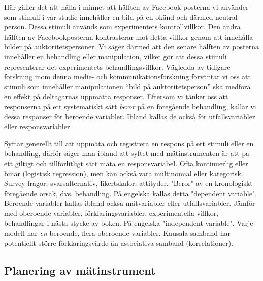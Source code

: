 \documentclass[
]{book}
\begin{document}
Här gäller det att hålla i minnet att hälften av Facebook-posterna vi använder som stimuli i vår studie innehåller en bild på en okänd och därmed neutral person. Dessa stimuli används som experimentets kontrollvillkor. Den andra hälften av Facebookposterna kontrasterar mot detta villkor genom att innehålla bilder på auktoritetspersoner. Vi säger därmed att den senare hälften av posterna innehåller en behandling eller manipulation, vilket gör att dessa stimuli representerar det experimentets behandlingsvillkor. Vägledda av tidigare forskning inom denna medie- och kommunikationsforskning förväntar vi oss att stimuli som innehåller manipulationen ``bild på auktoritetsperson'' ska medföra en effekt på deltagarnas uppmätta responser. Eftersom vi tänker oss att responserna på ett systematiskt sätt \emph{beror} på en föregående behandling, kallar vi dessa responser för beroende variabler. Ibland kallas de också för utfallsvariabler eller responsvariabler.

Syftar generellt till att uppmäta och registrera en respons på ett stimuli eller en behandling, därför säger man ibland att syftet med mätinstrumenten är att på ett giltigt och tillförlitligt sätt mäta en responsvariabel. Ofta kontinuerlig eller binär (logistisk regression), men kan också vara multinomial eller kategorisk. Survey-frågor, svarsalternativ, likertskalor, attityder. "Beror" av en kronologiskt föregående orsak, dvs. behandling. På engelska kallas detta "dependent variable". Beroende variabler kallas ibland också mätvariabler eller utfallsvariabler. Jämför med oberoende variabler, förklaringsvariabler, experimentella villkor, behandlingar i nästa stycke av boken. På engelska "independent variable". Varje modell har \emph{en} beroende, flera oberoende variabler. Kausala samband har potentiellt större förklaringsvärde än associativa samband (korrelationer).

\hypertarget{sub07.3.5}{%
\subsection{Planering av mätinstrument}\label{sub07.3.5}}
\end{document}
